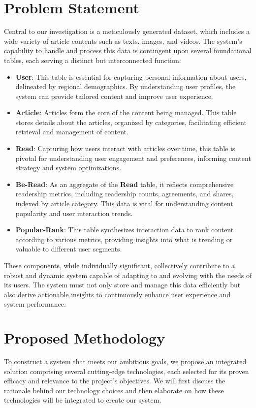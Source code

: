 \documentclass{article}
\begin{document}
    \section{Problem Statement}
    Central to our investigation is a meticulously generated dataset, which includes a wide variety of article contents such as texts, images, and videos. The system's capability to handle and process this data is contingent upon several foundational tables, each serving a distinct but interconnected function:

    \begin{itemize}
        \item \textbf{User}: This table is essential for capturing personal information about users, delineated by regional demographics. By understanding user profiles, the system can provide tailored content and improve user experience.
        \item \textbf{Article}: Articles form the core of the content being managed. This table stores details about the articles, organized by categories, facilitating efficient retrieval and management of content.
        \item \textbf{Read}: Capturing how users interact with articles over time, this table is pivotal for understanding user engagement and preferences, informing content strategy and system optimizations.
        \item \textbf{Be-Read}: As an aggregate of the \textbf{Read} table, it reflects comprehensive readership metrics, including readership counts, agreements, and shares, indexed by article category. This data is vital for understanding content popularity and user interaction trends.
        \item \textbf{Popular-Rank}: This table synthesizes interaction data to rank content according to various metrics, providing insights into what is trending or valuable to different user segments.
    \end{itemize}

    These components, while individually significant, collectively contribute to a robust and dynamic system capable of adapting to and evolving with the needs of its users. The system must not only store and manage this data efficiently but also derive actionable insights to continuously enhance user experience and system performance.



    \section{Proposed Methodology}
    To construct a system that meets our ambitious goals, we propose an integrated solution comprising several cutting-edge technologies, each selected for its proven efficacy and relevance to the project's objectives. We will first discuss the rationale behind our technology choices and then elaborate on how these technologies will be integrated to create our system.
\end{document}
